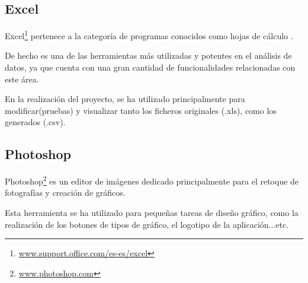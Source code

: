 \subsection{Excel}\label{excel}
Excel\footnote{\href{https://support.office.com/es-es/excel}{www.support.office.com/es-es/excel}} pertenece a la categoría de programas conocidos como hojas de cálculo \cite{excel}.

De hecho es una de las herramientas más utilizadas y potentes en el análisis de datos, ya que cuenta con una gran cantidad de funcionalidades relacionadas con este área.

En la realización del proyecto, se ha utilizado principalmente para modificar(pruebas) y visualizar tanto los ficheros originales (.xls), como los generados (.csv). 


\subsection{Photoshop}\label{photoshop}
Photoshop\footnote{\href{https://www.photoshop.com/}{www.photoshop.com}} es un editor de imágenes dedicado principalmente para el retoque de fotografías y creación de gráficos. 

Esta herramienta se ha utilizado para pequeñas tareas de diseño gráfico, como la realización de los botones de tipos de gráfico, el logotipo de la aplicación...etc.
